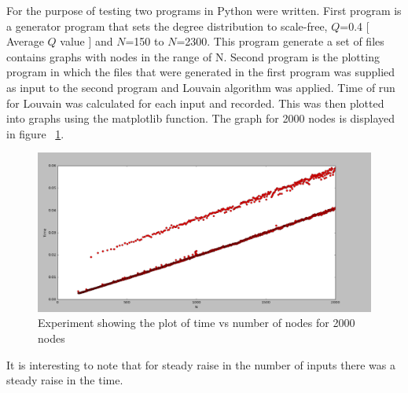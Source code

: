\par For the purpose of testing two programs in Python were written. First program is a generator program that sets the degree distribution to scale-free, $Q$=0.4 [ Average $Q$ value ] and $N$=150 to $N$=2300. This program generate a set of files contains graphs with nodes in the range of N. Second program is the plotting program in which the files that were generated in the first program was supplied as input to the second program and Louvain algorithm was applied. Time of run for Louvain was calculated for each input and recorded. This was then plotted into graphs using the matplotlib function. The graph for 2000 nodes is  displayed in figure ~\ref{ex3}.


\begin{figure}[H]
\centering
\includegraphics[scale=0.3]{e2000.png}
\caption{\label{ex3}Experiment showing the plot of time vs number of nodes for 2000 nodes}
\end{figure}


\par It  is interesting to note that for steady raise in the number of inputs there was a steady raise in the time.

